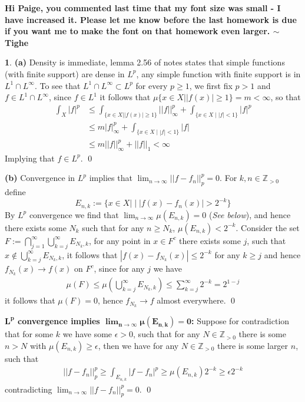 \documentclass[11pt]{article}
\theoremstyle{definition}
\newtheorem{pb}{}
\newcommand{\set}[1]{\{#1\}}
\newcommand{\abs}[1]{\left\vert#1\right\vert}
\newcommand{\norm}[1]{\lvert\lvert#1\rvert\rvert}
\begin{document}
\textbf{Hi Paige, you commented last time that my font size was small - I have increased it. Please let me know before the last homework is due if you want me to make the font on that homework even larger. \newline \(\mathbf{\sim}\) Tighe}
    \begin{pb}
        \textbf{(a)} Density is immediate, lemma 2.56 of notes states that simple functions (with finite support) are dense in \(L^p\), any simple function with finite support is in \(L^1 \cap L^\infty\). To see that \(L^1 \cap L^\infty \subset L^p\) for every \(p \geq 1\), we first fix \(p > 1\) and \(f \in L^1 \cap L^\infty\), since \(f \in L^1\) it follows that \(\mu\set{x \in X \vert \abs{f(x)} \geq 1} = m < \infty\), so that
        \begin{align*}
            \int_X \abs{f}^p &\leq \int_{\set{x \in X \vert \abs{f(x)} \geq 1}} \norm{f}_\infty^p + \int_{\set{x \in X \mid \abs{f} < 1}} \abs{f}^p \\ &\leq m\abs{f}_\infty^p + \int_{\set{x \in X \mid \abs{f} < 1}} \abs{f} \\ &\leq m\norm{f}_\infty^p + \norm{f}_1 < \infty
        \end{align*}
        Implying that \(f \in L^p\). \qed
        
        \textbf{(b)} Convergence in \(L^p\) implies that \(\lim_{n\to \infty}\norm{f - f_n}_p^p = 0\). For \(k,n \in \mathbb{Z}_{>0}\) define 
        \[E_{n,k} := \set{x \in X \vert \mid \abs{f(x) - f_n(x)} > 2^{-k}}\]
        By \(L^p\) convergence we find that \(\lim_{n\to\infty}\mu(E_{n,k}) = 0\) (\emph{See below}), and hence there exists some \(N_k\) such that for any \(n \geq N_k\), \(\mu(E_{n,k}) < 2^{-k}\). Consider the set \(F := \bigcap_{j = 1}^\infty \bigcup_{k = j}^\infty E_{N_k,k}\), for any point in \(x \in F^c\) there exists some \(j\), such that \(x \not \in \bigcup_{k=j}^\infty E_{N_k,k}\), it follows that \(\abs{f(x) - f_{N_k}(x)} \leq 2^{-k}\)  for any \(k \geq j\) and hence \(f_{N_k}(x) \to f(x)\) on \(F^c\), since for any \(j\) we have
        \begin{align*}
            \mu(F) \leq \mu\left(\bigcup_{k = j}^\infty E_{N_k,k}\right) \leq \sum_{k = j}^\infty 2^{-k} = 2^{1-j}
        \end{align*}
        it follows that \(\mu(F) = 0\), hence \(f_{N_k} \to f\) almost everywhere. \qed

        \textbf{\(\mathbf{L^p}\) convergence implies \(\mathbf{\lim_{n\to\infty}\mu(E_{n,k}) = 0}\):} Suppose for contradiction that for some \(k\) we have some \(\epsilon > 0\), such that for any \(N \in \mathbb{Z}_{>0}\) there is some \(n > N\) with \(\mu(E_{n,k}) \geq \epsilon\), then we have for any \(N \in \mathbb{Z}_{>0}\) there is some larger \(n\), such that 
        \begin{align*}
            \norm{f - f_n}_p^p \geq \int_{E_{n,k}} \abs{f - f_n}^p \geq \mu(E_{n,k})2^{-k} \geq \epsilon 2^{-k}
        \end{align*}
        contradicting \(\lim_{n\to\infty}\norm{f - f_n}_p^p = 0\). \qed


\end{pb}
\end{document}
